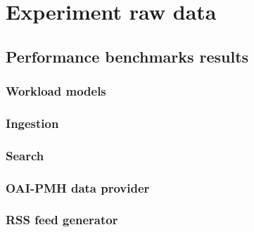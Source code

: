 \chapter[Experiment raw data]{Experiment raw data\label{ch:appendex-d:experimentation}}

\tablespacing

\bodyspacing

\section[Performance benchmarks]{Performance benchmarks results}
\label{ch:appendicies:experiment-raw-data:performance-benchmarks}

\subsection[Workload]{Workload models}
\label{sec:appendex-d:workload-models}

\tablespacing

\bodyspacing

\subsection[Ingestion]{Ingestion}
\label{sec:appendex-d:ingestion}

\tablespacing

\bodyspacing

\subsection[Search]{Search}
\label{sec:appendex-d:search}

\tablespacing

\bodyspacing

\subsection[OAI-PMH]{OAI-PMH data provider}
\label{sec:appendex-d:oaipmh-data-provider}

\tablespacing

\bodyspacing

\subsection[Feed]{RSS feed generator}
\label{sec:appendex-d:rss}

\tablespacing

\bodyspacing
